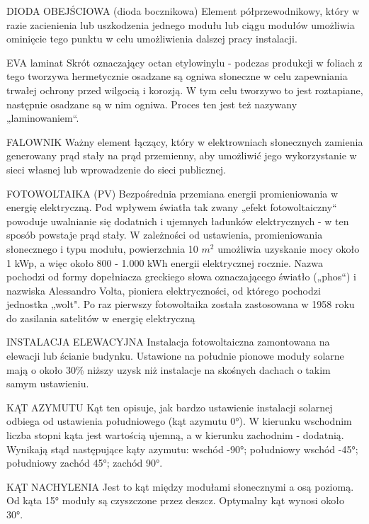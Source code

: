 \documentclass[12pt,a4paper]{article}
\begin{document}
DIODA OBEJŚCIOWA (dioda bocznikowa)
Element półprzewodnikowy, który w razie zacienienia lub uszkodzenia jednego modułu lub ciągu modułów umożliwia ominięcie tego punktu w celu umożliwienia dalszej pracy instalacji.

EVA laminat
Skrót oznaczający octan etylowinylu - podczas produkcji w foliach z tego tworzywa hermetycznie osadzane są ogniwa słoneczne w celu zapewniania trwałej ochrony przed wilgocią i korozją. W tym celu tworzywo to jest roztapiane, następnie osadzane są w nim ogniwa. Proces ten jest też nazywany „laminowaniem“.


FALOWNIK
Ważny element łączący, który w elektrowniach słonecznych zamienia generowany prąd stały na prąd przemienny, aby umożliwić jego wykorzystanie w sieci własnej lub wprowadzenie do sieci publicznej.


FOTOWOLTAIKA (PV)
Bezpośrednia przemiana energii promieniowania w energię elektryczną. Pod wpływem światła tak zwany „efekt fotowoltaiczny“ powoduje uwalnianie się dodatnich i ujemnych ładunków elektrycznych - w ten sposób powstaje prąd stały. W zależności od ustawienia, promieniowania słonecznego i typu modułu, powierzchnia 10 ${m^{2}}$ umożliwia uzyskanie mocy około 1 kWp, a więc około 800 - 1.000 kWh energii elektrycznej rocznie. Nazwa pochodzi od formy dopełniacza greckiego słowa oznaczającego światło („phos“) i nazwiska Alessandro Volta, pioniera elektryczności, od którego pochodzi jednostka „wolt". Po raz pierwszy fotowoltaika została zastosowana w 1958 roku do zasilania satelitów w energię elektryczną

INSTALACJA ELEWACYJNA
Instalacja fotowoltaiczna zamontowana na elewacji lub ścianie budynku. Ustawione na południe pionowe moduły solarne mają o około 30\% niższy uzysk niż instalacje na skośnych dachach o takim samym ustawieniu.


KĄT AZYMUTU
Kąt ten opisuje, jak bardzo ustawienie instalacji solarnej odbiega od ustawienia południowego (kąt azymutu 0°). W kierunku wschodnim liczba stopni kąta jest wartością ujemną, a w kierunku zachodnim - dodatnią. Wynikają stąd następujące kąty azymutu: wschód -90°; południowy wschód -45°; południowy zachód 45°; zachód 90°.


KĄT NACHYLENIA
Jest to kąt między modułami słonecznymi a osą poziomą. Od kąta 15° moduły są czyszczone przez deszcz. Optymalny kąt wynosi około 30°.
\end{document}

